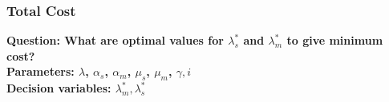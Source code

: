 \documentclass[letter,11pt]{article}
\begin{document}
\begin{itemize}
%
%
%
%
%
%
%

\end{itemize}

\subsubsection{Total Cost} 

\textbf{Question: What are optimal values for $\lambda_s^{*}$ and $\lambda_m^{*}$ to give minimum cost?} \\
\textbf{Parameters: $\lambda$, $\alpha_s$, $\alpha_m$, $\mu_s$, $\mu_m$, $\gamma, i$} \\
\textbf{Decision variables: $\lambda_m^{*}, \lambda_s^{*}$} \\
\end{document}
